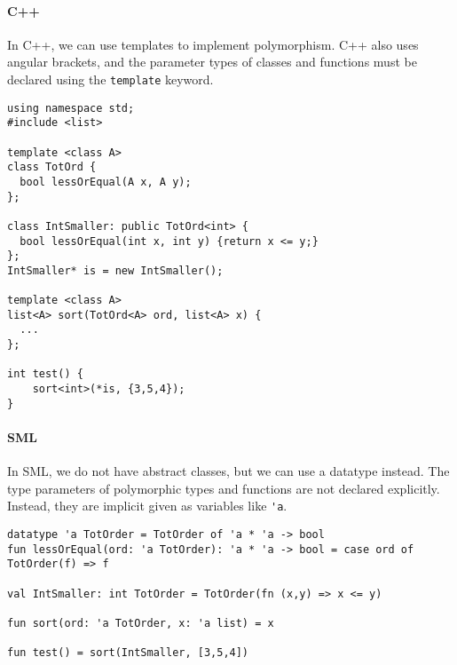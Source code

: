 \paragraph{C++}
In C++, we can use templates to implement polymorphism.
C++ also uses angular brackets, and the parameter types of classes and functions must be declared using the \lstinline|template| keyword.

\begin{lstlisting}
using namespace std;
#include <list>

template <class A>
class TotOrd {
  bool lessOrEqual(A x, A y);
};

class IntSmaller: public TotOrd<int> {
  bool lessOrEqual(int x, int y) {return x <= y;}
};
IntSmaller* is = new IntSmaller();
  
template <class A>
list<A> sort(TotOrd<A> ord, list<A> x) {
  ...
};

int test() {
    sort<int>(*is, {3,5,4});  
}
\end{lstlisting}

\paragraph{SML}
In SML, we do not have abstract classes, but we can use a datatype instead.
The type parameters of polymorphic types and functions are not declared explicitly.
Instead, they are implicit given as variables like \lstinline|'a|.

\begin{lstlisting}
datatype 'a TotOrder = TotOrder of 'a * 'a -> bool
fun lessOrEqual(ord: 'a TotOrder): 'a * 'a -> bool = case ord of TotOrder(f) => f

val IntSmaller: int TotOrder = TotOrder(fn (x,y) => x <= y)

fun sort(ord: 'a TotOrder, x: 'a list) = x

fun test() = sort(IntSmaller, [3,5,4])
\end{lstlisting}